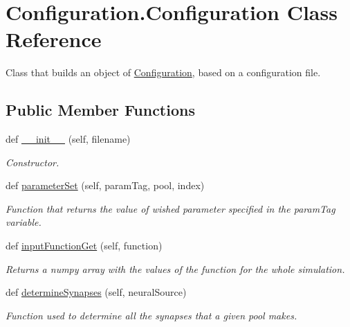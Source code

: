 \hypertarget{class_configuration_1_1_configuration}{}\section{Configuration.\+Configuration Class Reference}
\label{class_configuration_1_1_configuration}


Class that builds an object of \hyperlink{class_configuration_1_1_configuration}{Configuration}, based on a configuration file.  


\subsection*{Public Member Functions}
\begin{DoxyCompactItemize}
\item 
def \hyperlink{class_configuration_1_1_configuration_a2ba2e2fc97989c9d24632e4c403449c6}{\+\_\+\+\_\+init\+\_\+\+\_\+} (self, filename)
\begin{DoxyCompactList}\small\item\em Constructor. \end{DoxyCompactList}\item 
def \hyperlink{class_configuration_1_1_configuration_a31dc42dad64aef1518ca3fa14ea59625}{parameter\+Set} (self, param\+Tag, pool, index)
\begin{DoxyCompactList}\small\item\em Function that returns the value of wished parameter specified in the param\+Tag variable. \end{DoxyCompactList}\item 
def \hyperlink{class_configuration_1_1_configuration_a4fa34cff99386a55f1499f4dcdcd22be}{input\+Function\+Get} (self, function)
\begin{DoxyCompactList}\small\item\em Returns a numpy array with the values of the function for the whole simulation. \end{DoxyCompactList}\item 
def \hyperlink{class_configuration_1_1_configuration_ac2160d0341a793aa0fc1211757f08a73}{determine\+Synapses} (self, neural\+Source)
\begin{DoxyCompactList}\small\item\em Function used to determine all the synapses that a given pool makes. \end{DoxyCompactList}\end{DoxyCompactItemize}

